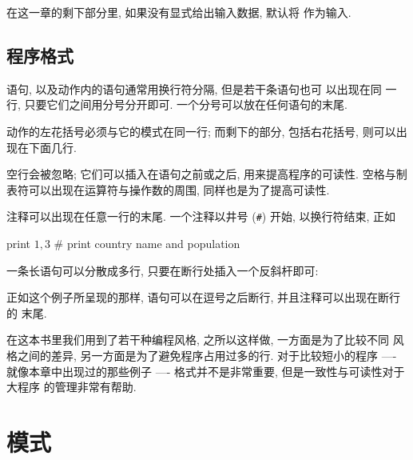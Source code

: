 在这一章的剩下部分里, 如果没有显式给出输入数据, 默认将 
作为输入.

\subsection*{程序格式}
\label{subsec:program_format}

\patact 语句, 以及动作内的语句通常用换行符分隔, 但是若干条语句也可
以出现在同
一行, 只要它们之间用分号分开即可. 一个分号可以放在任何语句的末尾.

动作的左花括号必须与它的模式在同一行; 而剩下的部分, 包括右花括号, 则可以出
现在下面几行.

空行会被忽略; 它们可以插入在语句之前或之后, 用来提高程序的可读性. 空格与制
表符可以出现在运算符与操作数的周围, 同样也是为了提高可读性.

注释可以出现在任意一行的末尾. 一个注释以井号 (\verb'#') 开始,
以换行符结束, 正如
\begin{myverb}
    { print $1, $3 }    # print country name and population
\end{myverb}

一条长语句可以分散成多行, 只要在断行处插入一个反斜杆即可:
正如这个例子所呈现的那样, 语句可以在逗号之后断行, 并且注释可以出现在断行的
末尾.

在这本书里我们用到了若干种编程风格, 之所以这样做, 一方面是为了比较不同
风格之间的差异, 另一方面是为了避免程序占用过多的行. 对于比较短小的程序
---- 就像本章中出现过的那些例子 ----
格式并不是非常重要, 但是一致性与可读性对于大程序
的管理非常有帮助.

\section{模式}
\label{sec:patterns}

